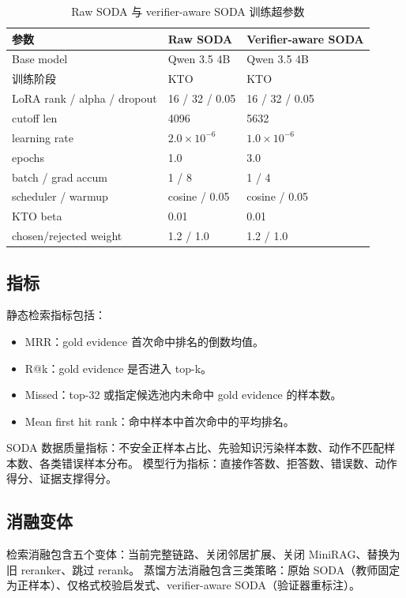 \documentclass[UTF8,a4paper,12pt]{ctexart}
\begin{document}
\begin{table}[htbp]
\centering
\small
\begin{tabular}{lll}
\toprule
参数 & Raw SODA & Verifier-aware SODA \\
\midrule
Base model & Qwen 3.5 4B & Qwen 3.5 4B \\
训练阶段 & KTO & KTO \\
LoRA rank / alpha / dropout & 16 / 32 / 0.05 & 16 / 32 / 0.05 \\
cutoff len & 4096 & 5632 \\
learning rate & $2.0\times10^{-6}$ & $1.0\times10^{-6}$ \\
epochs & 1.0 & 3.0 \\
batch / grad accum & 1 / 8 & 1 / 4 \\
scheduler / warmup & cosine / 0.05 & cosine / 0.05 \\
KTO beta & 0.01 & 0.01 \\
chosen/rejected weight & 1.2 / 1.0 & 1.2 / 1.0 \\
\bottomrule
\end{tabular}
\caption{Raw SODA 与 verifier-aware SODA 训练超参数}
\end{table}

\subsection{指标}

静态检索指标包括：
\begin{itemize}
  \item MRR：gold evidence 首次命中排名的倒数均值。
  \item R@k：gold evidence 是否进入 top-k。
  \item Missed：top-32 或指定候选池内未命中 gold evidence 的样本数。
  \item Mean first hit rank：命中样本中首次命中的平均排名。
\end{itemize}

SODA 数据质量指标：不安全正样本占比、先验知识污染样本数、动作不匹配样本数、各类错误样本分布。
模型行为指标：直接作答数、拒答数、错误数、动作得分、证据支撑得分。

\subsection{消融变体}

检索消融包含五个变体：当前完整链路、关闭邻居扩展、关闭 MiniRAG、替换为旧 reranker、跳过 rerank。
蒸馏方法消融包含三类策略：原始 SODA（教师固定为正样本）、仅格式校验启发式、verifier-aware SODA（验证器重标注）。
\end{document}
